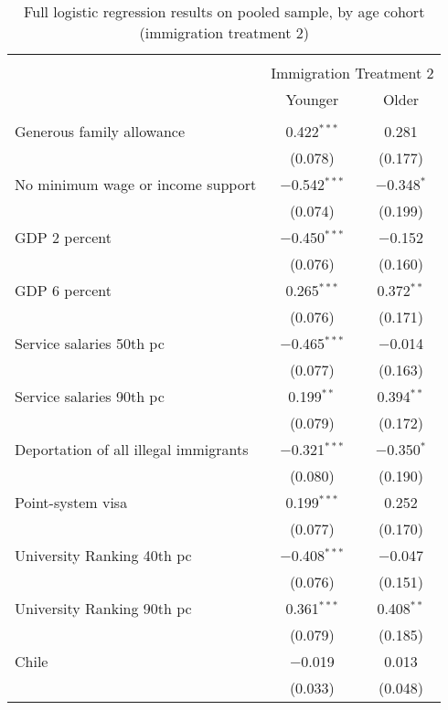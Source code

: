 
\begin{table}[!htbp] \centering 
  \caption{Full logistic regression results on pooled sample, by age cohort (immigration treatment 2)} 
  \label{tab:age_full_2} 
\footnotesize 
\begin{tabular}{@{\extracolsep{5pt}}lcc} 
\\[-1.8ex]\hline 
\hline \\[-1.8ex] 
 & \multicolumn{2}{c}{Immigration Treatment 2} \\ 
\cline{2-3} 
 & Younger & Older \\ 
\hline \\[-1.8ex] 
 Generous family allowance & 0.422$^{***}$ & 0.281 \\ 
  & (0.078) & (0.177) \\ 
  No minimum wage or income support & $-$0.542$^{***}$ & $-$0.348$^{*}$ \\ 
  & (0.074) & (0.199) \\ 
  GDP 2 percent & $-$0.450$^{***}$ & $-$0.152 \\ 
  & (0.076) & (0.160) \\ 
  GDP 6 percent & 0.265$^{***}$ & 0.372$^{**}$ \\ 
  & (0.076) & (0.171) \\ 
  Service salaries 50th pc & $-$0.465$^{***}$ & $-$0.014 \\ 
  & (0.077) & (0.163) \\ 
  Service salaries 90th pc & 0.199$^{**}$ & 0.394$^{**}$ \\ 
  & (0.079) & (0.172) \\ 
  Deportation of all illegal immigrants & $-$0.321$^{***}$ & $-$0.350$^{*}$ \\ 
  & (0.080) & (0.190) \\ 
  Point-system visa & 0.199$^{***}$ & 0.252 \\ 
  & (0.077) & (0.170) \\ 
  University Ranking 40th pc & $-$0.408$^{***}$ & $-$0.047 \\ 
  & (0.076) & (0.151) \\ 
  University Ranking 90th pc & 0.361$^{***}$ & 0.408$^{**}$ \\ 
  & (0.079) & (0.185) \\ 
  Chile & $-$0.019 & 0.013 \\ 
  & (0.033) & (0.048) \\ 

\end{tabular}
\end{table}

